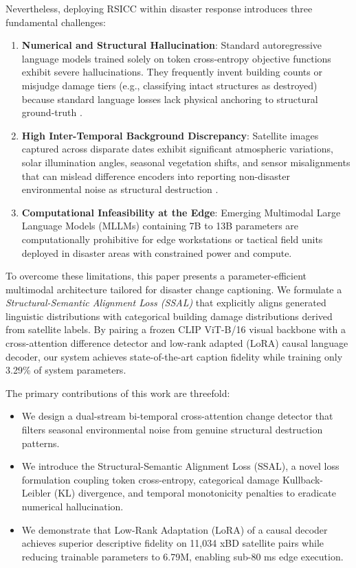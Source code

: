 \documentclass[conference]{IEEEtran}
\begin{document}
Nevertheless, deploying RSICC within disaster response introduces three fundamental challenges:
\begin{enumerate}
    \item \textbf{Numerical and Structural Hallucination}: Standard autoregressive language models trained solely on token cross-entropy objective functions exhibit severe hallucinations. They frequently invent building counts or misjudge damage tiers (e.g., classifying intact structures as destroyed) because standard language losses lack physical anchoring to structural ground-truth \cite{sun2026echochange}.
    \item \textbf{High Inter-Temporal Background Discrepancy}: Satellite images captured across disparate dates exhibit significant atmospheric variations, solar illumination angles, seasonal vegetation shifts, and sensor misalignments that can mislead difference encoders into reporting non-disaster environmental noise as structural destruction \cite{zhu2025change3d}.
    \item \textbf{Computational Infeasibility at the Edge}: Emerging Multimodal Large Language Models (MLLMs) containing 7B to 13B parameters \cite{wang2024qwen2vl, wang2026rsiccllm, zhang2024earthgpt} are computationally prohibitive for edge workstations or tactical field units deployed in disaster areas with constrained power and compute.
\end{enumerate}

To overcome these limitations, this paper presents a parameter-efficient multimodal architecture tailored for disaster change captioning. We formulate a \textit{Structural-Semantic Alignment Loss (SSAL)} that explicitly aligns generated linguistic distributions with categorical building damage distributions derived from satellite labels. By pairing a frozen CLIP ViT-B/16 visual backbone with a cross-attention difference detector and low-rank adapted (LoRA) causal language decoder, our system achieves state-of-the-art caption fidelity while training only 3.29\% of system parameters.

The primary contributions of this work are threefold:
\begin{itemize}
    \item We design a dual-stream bi-temporal cross-attention change detector that filters seasonal environmental noise from genuine structural destruction patterns.
    \item We introduce the Structural-Semantic Alignment Loss (SSAL), a novel loss formulation coupling token cross-entropy, categorical damage Kullback-Leibler (KL) divergence, and temporal monotonicity penalties to eradicate numerical hallucination.
    \item We demonstrate that Low-Rank Adaptation (LoRA) of a causal decoder achieves superior descriptive fidelity on 11,034 xBD satellite pairs while reducing trainable parameters to 6.79M, enabling sub-80 ms edge execution.
\end{itemize}
\end{document}

